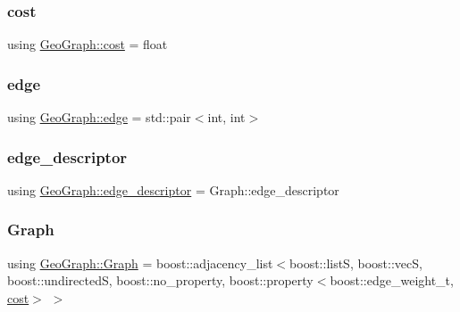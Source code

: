 \subsubsection{\texorpdfstring{cost}{cost}}
{\footnotesize\ttfamily using \mbox{\hyperlink{class_geo_graph_aeab86df7ed72508486bdae447ae14fa7}{Geo\+Graph\+::cost}} =  float}

\mbox{\label{class_geo_graph_a61f1fbc2a1a9272f92f3ab34d8d41f75}} 
\subsubsection{\texorpdfstring{edge}{edge}}
{\footnotesize\ttfamily using \mbox{\hyperlink{class_geo_graph_a61f1fbc2a1a9272f92f3ab34d8d41f75}{Geo\+Graph\+::edge}} =  std\+::pair$<$int, int$>$}

\mbox{\label{class_geo_graph_a25a89bd71a817e31c8cca4556cdfdb54}} 
\subsubsection{\texorpdfstring{edge\_descriptor}{edge\_descriptor}}
{\footnotesize\ttfamily using \mbox{\hyperlink{class_geo_graph_a25a89bd71a817e31c8cca4556cdfdb54}{Geo\+Graph\+::edge\+\_\+descriptor}} =  Graph\+::edge\+\_\+descriptor}

\mbox{\label{class_geo_graph_a4f8c3bf1eb9f30bc227f300d7460debb}} 
\subsubsection{\texorpdfstring{Graph}{Graph}}
{\footnotesize\ttfamily using \mbox{\hyperlink{class_geo_graph_a4f8c3bf1eb9f30bc227f300d7460debb}{Geo\+Graph\+::\+Graph}} =  boost\+::adjacency\+\_\+list$<$boost\+::listS, boost\+::vecS, boost\+::undirectedS, boost\+::no\+\_\+property, boost\+::property$<$boost\+::edge\+\_\+weight\+\_\+t, \mbox{\hyperlink{class_geo_graph_aeab86df7ed72508486bdae447ae14fa7}{cost}}$>$ $>$}

\mbox{\label{class_geo_graph_a24b9a457c1b212d947a891e3e12ea5d2}} 
